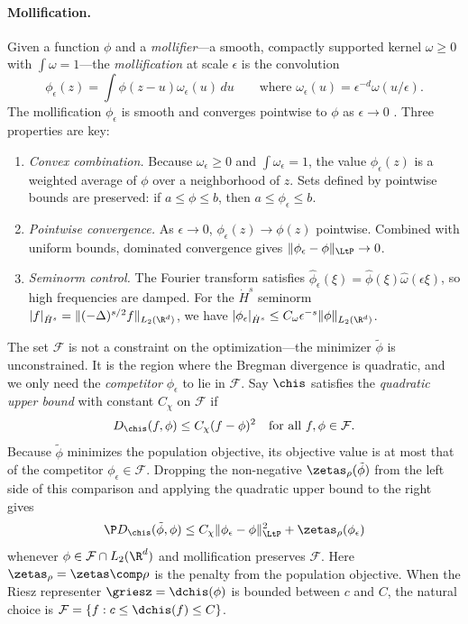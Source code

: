 \documentclass{article}
\newcommand{\F}{\mathcal{F}}
\begin{document}
\paragraph{Mollification.} Given a function $\phi$ and a \emph{mollifier}---a smooth, compactly supported kernel $\omega \ge 0$ with $\int \omega = 1$---the \emph{mollification} at scale $\epsilon$ is the convolution
\[
\phi_\epsilon(z) = \int \phi(z - u) \omega_\epsilon(u) \, du \qquad \text{where } \omega_\epsilon(u) = \epsilon^{-d} \omega(u/\epsilon).
\]
The mollification $\phi_\epsilon$ is smooth and converges pointwise to $\phi$ as $\epsilon \to 0$ \citep[Section 2.29]{adams2003sobolev}. Three properties are key:
\begin{enumerate}
\item \emph{Convex combination.} Because $\omega_\epsilon \ge 0$ and $\int \omega_\epsilon = 1$, the value $\phi_\epsilon(z)$ is a weighted average of $\phi$ over a neighborhood of $z$. Sets defined by pointwise bounds are preserved: if $a \le \phi \le b$, then $a \le \phi_\epsilon \le b$.
\item \emph{Pointwise convergence.} As $\epsilon \to 0$, $\phi_\epsilon(z) \to \phi(z)$ pointwise. Combined with uniform bounds, dominated convergence gives $\|\phi_\epsilon - \phi\|_{\LtP} \to 0$.
\item \emph{Seminorm control.} The Fourier transform satisfies $\hat\phi_\epsilon(\xi) = \hat\phi(\xi) \hat\omega(\epsilon\xi)$, so high frequencies are damped. For the $\dot H^s$ seminorm $|f|_{\dot H^s} = \|(-\Delta)^{s/2} f\|_{L_2(\R^d)}$, we have $|\phi_\epsilon|_{\dot H^s} \le C_\omega \epsilon^{-s} \|\phi\|_{L_2(\R^d)}$.
\end{enumerate}

The set $\F$ is not a constraint on the optimization---the minimizer $\tilde\phi$ is unconstrained. It is the region where the Bregman divergence is quadratic, and we only need the \emph{competitor} $\phi_\epsilon$ to lie in $\F$. Say $\chis$ satisfies the \emph{quadratic upper bound} with constant $C_\chi$ on $\F$ if
\[
D_{\chis}(f, \phi) \le C_\chi (f - \phi)^2 \quad \text{for all } f, \phi \in \F.
\]
Because $\tilde\phi$ minimizes the population objective, its objective value is at most that of the competitor $\phi_\epsilon \in \F$. Dropping the non-negative $\zetas_\rho(\tilde\phi)$ from the left side of this comparison and applying the quadratic upper bound to the right gives
\begin{equation}\label{eq:approx-competitor}
\P D_{\chis}(\tilde\phi, \phi) \le C_\chi \|\phi_\epsilon - \phi\|_{\LtP}^2 + \zetas_\rho(\phi_\epsilon)
\end{equation}
whenever $\phi \in \F \cap L_2(\R^d)$ and mollification preserves $\F$. Here $\zetas_\rho = \zetas \comp \rho$ is the penalty from the population objective. When the Riesz representer $\griesz = \dchis(\phi)$ is bounded between $c$ and $C$, the natural choice is $\F = \{f : c \le \dchis(f) \le C\}$.
\end{document}
